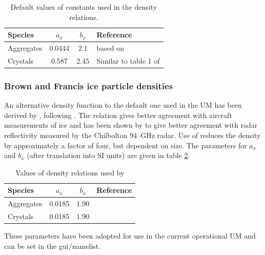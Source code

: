 \documentclass{UMDP_article}
\begin{document}
\begin{table}[ht!]
\begin{center}
\begin{tabular}{lccl}
\hline
Species           & {$a_x$} & {$b_x$} & Reference \\ \hline
Aggregates       & 0.0444  & 2.1     
& based on \cite{Locatelli:Hobbs:1974} \\ \hline
Crystals & 0.587   & 2.45    & Similar to table 1 of \cite{Mitchell:1996}
\\
\hline
\end{tabular}
\end{center}
\caption{Default values of constants used in the density relations.}
\label{tab:mic_consts_density}
\end{table}

\subsubsection{Brown and Francis ice particle densities}            
\label{sec:bf95}  

An alternative density function to the default one used in the UM has been 
derived by \cite{Brown:Francis:1995}, following \cite{Locatelli:Hobbs:1974}.
The relation gives better agreement with aircraft measurements of ice
and has been shown by \cite{Wilkinson:2007} to give better agreement with 
radar reflectivity measured by the Chilbolton 94--GHz radar. Use of
\cite{Brown:Francis:1995} reduces the density by approximately a factor of
four, but dependent on size. 
The parameters for $a_x$ and $b_x$ (after translation into SI units)
are given in table \ref{tab:bf95}. 

\begin{table}[ht!]
\begin{center}
\begin{tabular}{lccl}
\hline
Species    & {$a_x$}  & {$b_x$} & Reference                   \\ 
\hline
Aggregates & 0.0185   & 1.90    & \cite{Brown:Francis:1995}    \\
Crystals   & 0.0185   & 1.90    & \cite{Brown:Francis:1995}     \\
\hline
\end{tabular}
\end{center}
\caption{Values of density relations used by \cite{Brown:Francis:1995}}
\label{tab:bf95}
\end{table}

These parameters have been adopted for use in the current operational UM and 
can be set in the gui/namelist.
\end{document}
